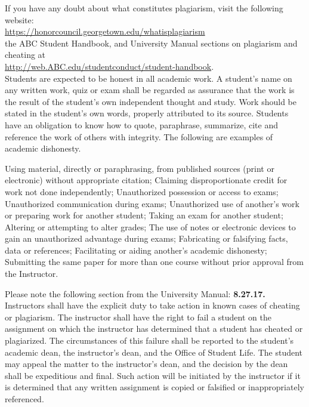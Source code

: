 If you have any doubt about what constitutes plagiarism, visit the following website:\\

 \url{https://honorcouncil.georgetown.edu/whatisplagiarism}\\
 
 the ABC Student Handbook, and University Manual sections on plagiarism and cheating at\\
 
\url{http://web.ABC.edu/studentconduct/student-handbook}.  \\


Students are expected to be honest in all academic work. A student’s name on any written work, quiz or exam shall be regarded as assurance that the work is the result of the student’s own independent thought and study. Work should be stated in the student’s own words, properly attributed to its source. Students have an obligation to know how to quote, paraphrase, summarize, cite and reference the work of others with integrity. The following are examples of academic dishonesty.
\begin{outline}
	\1	Using material, directly or paraphrasing, from published sources (print or electronic) without appropriate citation;
	\1	Claiming disproportionate credit for work not done independently;
	\1	Unauthorized possession or access to exams;
	\1	Unauthorized communication during exams;
	\1	Unauthorized use of another’s work or preparing work for another student;
	\1	Taking an exam for another student;
	\1	Altering or attempting to alter grades;
	\1	The use of notes or electronic devices to gain an unauthorized advantage during exams;
	\1	Fabricating or falsifying facts, data or references;
	\1	Facilitating or aiding another’s academic dishonesty;
	\1	Submitting the same paper for more than one course without prior approval from the Instructor.
\end{outline}



Please note the following section from the University Manual:
\textbf{8.27.17.} Instructors shall have the explicit duty to take action in known cases of cheating or plagiarism. The instructor shall have the right to fail a student on the assignment on which the instructor has determined that a student has cheated or plagiarized. The circumstances of this failure shall be reported to the student’s academic dean, the instructor’s dean, and the Office of Student Life. The student may appeal the matter to the instructor’s dean, and the decision by the dean shall be expeditious and final.
Such action will be initiated by the instructor if it is determined that any written assignment is copied or falsified or inappropriately referenced.\\

